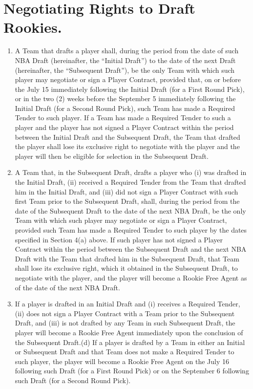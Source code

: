 \documentclass[
]{book}
\providecommand{\tightlist}{%
  \setlength{\itemsep}{0pt}\setlength{\parskip}{0pt}}
\begin{document}
\hypertarget{negotiating-rights-to-draft-rookies.}{%
\section{Negotiating Rights to Draft Rookies.}\label{negotiating-rights-to-draft-rookies.}}

\begin{enumerate}
\def\labelenumi{(\alph{enumi})}
\tightlist
\item
  A Team that drafts a player shall, during the period from the date of such NBA Draft (hereinafter, the ``Initial Draft'') to the date of the next Draft (hereinafter, the ``Subsequent Draft''), be the only Team with which such player may negotiate or sign a Player Contract, provided that, on or before the July 15 immediately following the Initial Draft (for a First Round Pick), or in the two (2) weeks before the September 5 immediately following the Initial Draft (for a Second Round Pick), such Team has made a Required Tender to such player. If a Team has made a Required Tender to such a player and the player has not signed a Player Contract within the period between the Initial Draft and the Subsequent Draft, the Team that drafted the player shall lose its exclusive right to negotiate with the player and the player will then be eligible for selection in the Subsequent Draft.
\item
  A Team that, in the Subsequent Draft, drafts a player who (i) was drafted in the Initial Draft, (ii) received a Required Tender from the Team that drafted him in the Initial Draft, and (iii) did not sign a Player Contract with such first Team prior to the Subsequent Draft, shall, during the period from the date of the Subsequent Draft to the date of the next NBA Draft, be the only Team with which such player may negotiate or sign a Player Contract, provided such Team has made a Required Tender to such player by the dates specified in Section 4(a) above. If such player has not signed a Player Contract within the period between the Subsequent Draft and the next NBA Draft with the Team that drafted him in the Subsequent Draft, that Team shall lose its exclusive right, which it obtained in the Subsequent Draft, to negotiate with the player, and the player will become a Rookie Free Agent as of the date of the next NBA Draft.
\item
  If a player is drafted in an Initial Draft and (i) receives a Required Tender, (ii) does not sign a Player Contract with a Team prior to the Subsequent Draft, and (iii) is not drafted by any Team in such Subsequent Draft, the player will become a Rookie Free Agent immediately upon the conclusion of the Subsequent Draft.(d) If a player is drafted by a Team in either an Initial or Subsequent Draft and that Team does not make a Required Tender to such player, the player will become a Rookie Free Agent on the July 16 following such Draft (for a First Round Pick) or on the September 6 following such Draft (for a Second Round Pick).

\end{enumerate}
\end{document}
